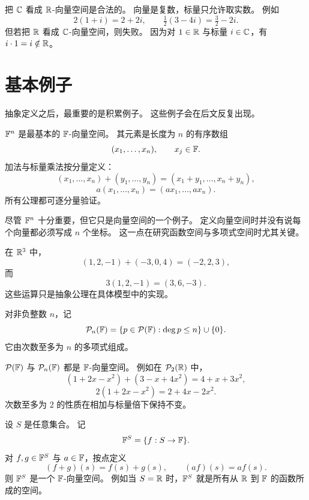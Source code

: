 \begin{example} 把 $\mathbb{C}$ 看成 $\mathbb{R}$-向量空间是合法的。
向量是复数，标量只允许取实数。 例如
\[ 2(1+i)=2+2i,
\qquad \tfrac12(3-4i)=\tfrac32-2i.
\] 但若把 $\mathbb{R}$ 看成 $\mathbb{C}$-向量空间，则失败。
因为对 $1\in\mathbb{R}$ 与标量 $i\in\mathbb{C}$，有 $i\cdot 1=i\notin\mathbb{R}$。 \end{example}

\section{基本例子}

抽象定义之后，最重要的是积累例子。 这些例子会在后文反复出现。

\begin{example} $\mathbb{F}^n$ 是最基本的 $\mathbb{F}$-向量空间。
其元素是长度为 $n$ 的有序数组 \[
(x_1,\dots,x_n),\qquad x_j\in\mathbb{F}. \]
加法与标量乘法按分量定义： \[
(x_1,\dots,x_n)+(y_1,\dots,y_n)=(x_1+y_1,\dots,x_n+y_n), \]
\[ a(x_1,\dots,x_n)=(ax_1,\dots,ax_n).
\] 所有公理都可逐分量验证。
\end{example}

\begin{remark} 尽管 $\mathbb{F}^n$ 十分重要，但它只是向量空间的一个例子。
定义向量空间时并没有说每个向量都必须写成 $n$ 个坐标。 这一点在研究函数空间与多项式空间时尤其关键。
\end{remark}

\begin{example} 在 $\mathbb{R}^3$ 中，
\[ (1,2,-1)+(-3,0,4)=(-2,2,3),
\] 而
\[ 3(1,2,-1)=(3,6,-3).
\] 这些运算只是抽象公理在具体模型中的实现。
\end{example}

\begin{notation} 对非负整数 $n$，记
\[ \mathcal{P}_n(\mathbb{F})=\{p\in\mathcal{P}(\mathbb{F}):\deg p\le n\}\cup\{0\}.
\] 它由次数至多为 $n$ 的多项式组成。
\end{notation}

\begin{example} $\mathcal{P}(\mathbb{F})$ 与 $\mathcal{P}_n(\mathbb{F})$ 都是 $\mathbb{F}$-向量空间。
例如在 $\mathcal{P}_2(\mathbb{R})$ 中， \[
(1+2x-x^2)+(3-x+4x^2)=4+x+3x^2, \]
\[ 2(1+2x-x^2)=2+4x-2x^2.
\] 次数至多为 $2$ 的性质在相加与标量倍下保持不变。
\end{example}

\begin{example} 设 $S$ 是任意集合。
记 \[
\mathbb{F}^S=\{f:S\to\mathbb{F}\}. \]
对 $f,g\in\mathbb{F}^S$ 与 $a\in\mathbb{F}$，按点定义 \[
(f+g)(s)=f(s)+g(s), \qquad
(af)(s)=a f(s). \]
则 $\mathbb{F}^S$ 是一个 $\mathbb{F}$-向量空间。 例如当 $S=\mathbb{R}$ 时，$\mathbb{F}^S$ 就是所有从 $\mathbb{R}$ 到 $\mathbb{F}$ 的函数所成的空间。
\end{example}

